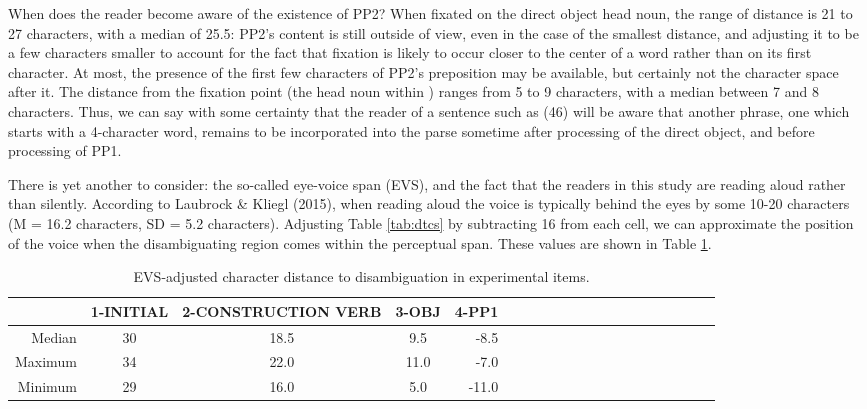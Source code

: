 \documentclass[12pt,oneside]{book}
\begin{document}
When does the reader become aware of the existence of PP2? When fixated on the direct object head noun, the range of distance is 21 to 27 characters, with a median of 25.5: PP2's content is still outside of view, even in the case of the smallest distance, and adjusting it to be a few characters smaller to account for the fact that fixation is likely to occur closer to the center of a word rather than on its first character. At most, the presence of the first few characters of PP2's preposition may be available, but certainly not the character space after it. The distance from the  fixation point (the head noun within )  ranges from 5 to 9 characters, with a median between 7 and 8 characters. Thus, we can say with some certainty that the reader of a sentence such as (46) will be aware that another phrase, one which starts with a 4-character word, remains to be incorporated into the parse sometime after processing of the direct object, and before processing of PP1.

There is yet another  to consider: the so-called eye-voice span (EVS), and the fact that the readers in this study are reading aloud rather than silently. According to Laubrock \& Kliegl (2015), when reading aloud the voice is typically behind the eyes by some 10-20 characters (M = 16.2 characters, SD = 5.2 characters). Adjusting Table \ref{tab:dtcs} by subtracting 16 from each cell, we can approximate the position of the voice when the disambiguating region comes within the perceptual span. These values are shown in Table \ref{tab:evsdtcr}.

\begin{table}[!h]

\caption{\label{tab:evsdtcr}EVS-adjusted character distance to disambiguation in experimental items.}
\centering
\begin{tabular}{rcccrcccrcccrcccrccc}
\toprule
  & 1-INITIAL & 2-CONSTRUCTION VERB & 3-OBJ & 4-PP1\\
\midrule
Median & 30 & 18.5 & 9.5 & -8.5\\
Maximum & 34 & 22.0 & 11.0 & -7.0\\
Minimum & 29 & 16.0 & 5.0 & -11.0\\
\bottomrule
\end{tabular}
\end{table}
\end{document}
